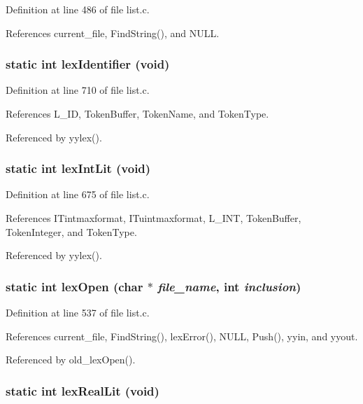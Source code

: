 Definition at line 486 of file list.c.

References current\_\-file, Find\-String(), and NULL.
\subsubsection{\setlength{\rightskip}{0pt plus 5cm}static int lex\-Identifier (void)\hspace{0.3cm}{\tt  [static]}}\label{list_8c_7a3fc4e536d8cd6557813fc268c7ab17}




Definition at line 710 of file list.c.

References L\_\-ID, Token\-Buffer, Token\-Name, and Token\-Type.

Referenced by yylex().
\subsubsection{\setlength{\rightskip}{0pt plus 5cm}static int lex\-Int\-Lit (void)\hspace{0.3cm}{\tt  [static]}}\label{list_8c_b4d80c79ae9eee0f23503a14992b15f3}




Definition at line 675 of file list.c.

References ITintmaxformat, ITuintmaxformat, L\_\-INT, Token\-Buffer, Token\-Integer, and Token\-Type.

Referenced by yylex().
\subsubsection{\setlength{\rightskip}{0pt plus 5cm}static int lex\-Open (char $\ast$ {\em file\_\-name}, int {\em inclusion})\hspace{0.3cm}{\tt  [static]}}\label{list_8c_f4bc9d1d5f9f8832227337132a15154f}




Definition at line 537 of file list.c.

References current\_\-file, Find\-String(), lex\-Error(), NULL, Push(), yyin, and yyout.

Referenced by old\_\-lex\-Open().
\subsubsection{\setlength{\rightskip}{0pt plus 5cm}static int lex\-Real\-Lit (void)\hspace{0.3cm}{\tt  [static]}}\label{list_8c_23866f3da76c821001534f69cda63967}




